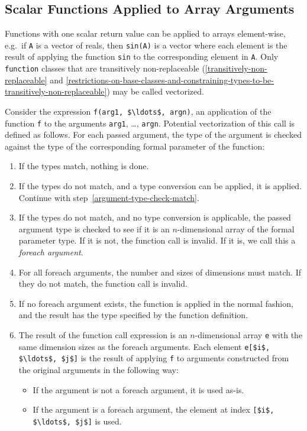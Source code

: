\subsection{Scalar Functions Applied to Array Arguments}\label{scalar-functions-applied-to-array-arguments}

Functions with one scalar return value can be applied to arrays element-wise, e.g.\ if \lstinline!A! is a vector of reals, then \lstinline!sin(A)! is a vector where each element is the result of applying the function \lstinline!sin! to the corresponding element in \lstinline!A!.  Only \lstinline!function! classes that are transitively non-replaceable (\cref{transitively-non-replaceable} and \cref{restrictions-on-base-classes-and-constraining-types-to-be-transitively-non-replaceable}) may be called vectorized.

Consider the expression \lstinline!f(arg1, $\ldots$, argn)!, an application of the function \lstinline!f! to the arguments \lstinline!arg1!, \ldots, \lstinline!argn!.
Potential vectorization of this call is defined as follows.
For each passed argument, the type of the argument is checked against the type of the corresponding formal parameter of the function:
\begin{enumerate}
\item\label{argument-type-check-match}
  If the types match, nothing is done.
\item
  If the types do not match, and a type conversion can be applied, it is
  applied. Continue with step~\ref{argument-type-check-match}.
\item
  If the types do not match, and no type conversion is applicable, the passed argument type is checked to see if it is an $n$-dimensional array of the formal parameter type.  If it is not, the function call is invalid.  If it is, we call this a \emph{foreach argument}.
\item
  For all foreach arguments, the number and sizes of dimensions must
  match. If they do not match, the function call is invalid.
\item
  If no foreach argument exists, the function is applied in the normal
  fashion, and the result has the type specified by the function
  definition.
\item
  The result of the function call expression is an $n$-dimensional array \lstinline!e! with the same dimension sizes as the foreach arguments.
  Each element \lstinline!e[$i$, $\ldots$, $j$]! is the result of applying \lstinline!f! to arguments constructed from the original arguments in the following way:
\begin{itemize}
\item
  If the argument is not a foreach argument, it is used as-is.
\item
  If the argument is a foreach argument, the element at index \lstinline![$i$, $\ldots$, $j$]! is used.
\end{itemize}
\end{enumerate}

